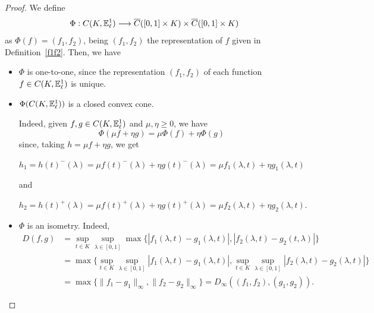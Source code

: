 \documentclass{amsart}
\newcommand{\R}{{\mathbb{R}}}
\newcommand{\fn}{\mathbb{E}\sp{1}}
\begin{document}
\begin{proof}
We define
$$\Phi:C(K,\fn_{\ell})\longrightarrow \overline{C}([0,1]\times K)\times \overline{C}([0,1]\times K)$$
as $\Phi(f)=(f_1,f_2)$, being $(f_1,f_2)$ the representation of $f$ given in Definition~\ref{f1f2}.
Then, we have
\begin{itemize}
\item[(i)] $\Phi$ is one-to-one, since the representation $(f_1,f_2)$ of each function $f\in C(K,\fn_{\ell})$ is unique.

\item[(ii)]  $\Phi(C(K,\fn_{\ell}))$ is a closed convex cone.

Indeed, given $f,g\in C(K,\fn_{\ell})$ and $\mu,\eta\geq 0$, we have
$$\Phi(\mu f+\eta g)=\mu\Phi(f)+\eta\Phi(g)$$
since, taking $h=\mu f+\eta g$, we get

$h_1 =h(t)^-(\lambda)=\mu f(t)^-(\lambda)+\eta g(t)^-(\lambda)=
\mu f_1(\lambda,t)+\eta g_1(\lambda,t)$

and

$h_2 =h(t)^+(\lambda)=\mu f(t)^+(\lambda)+\eta g(t)^+(\lambda)=
\mu f_2(\lambda,t)+ \eta g_2(\lambda,t).$
\item[(iii)] $\Phi$ is an isometry. Indeed,
\begin{align*}
D(f,g)&=\sup_{t\in K}\sup_{\lambda\in [0,1]}\max\{|f_1(\lambda,t)-g_1(\lambda,t)|,|f_2(\lambda,t)-g_2(t,\lambda)|\}\\
&=\max\{\sup_{t\in K}\sup_{\lambda\in [0,1]}|f_1(\lambda,t)-g_1(\lambda,t)|,\sup_{t\in K}\sup_{\lambda\in [0,1]}|f_2(\lambda,t)-g_2(\lambda,t)|\}\\
&=\max\{ \| f_1-g_1\|_{\infty}, \| f_2-g_2\|_{\infty}\}
=D_{\infty}((f_1,f_2),(g_1,g_2)).
\end{align*}
%
\end{itemize}

\end{proof}
\end{document}
